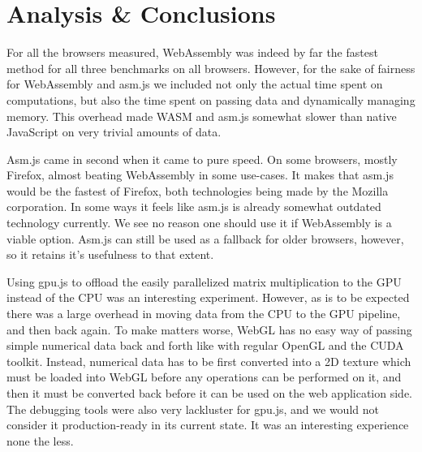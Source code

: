 \documentclass[conference]{IEEEtran}
\begin{document}
\section{Analysis \& Conclusions}
For all the browsers measured, WebAssembly was indeed by far the fastest method
for all three benchmarks on all browsers. However, for the sake of fairness for
WebAssembly and asm.js we included not only the actual time spent on
computations, but also the time spent on passing data and dynamically managing
memory. This overhead made WASM and asm.js somewhat slower than native
JavaScript on very trivial amounts of data.

Asm.js came in second when it came to pure speed. On some browsers, mostly
Firefox, almost beating WebAssembly in some use-cases. It makes that asm.js
would be the fastest of Firefox, both technologies being made by the Mozilla
corporation. In some ways it feels like asm.js is already somewhat outdated
technology currently. We see no reason one should use it if WebAssembly is a
viable option. Asm.js can still be used as a fallback for older browsers,
however, so it retains it's usefulness to that extent.

Using gpu.js to offload the easily parallelized matrix multiplication to the
GPU instead of the CPU was an interesting experiment. However, as is to be
expected there was a large overhead in moving data from the CPU to the GPU
pipeline, and then back again. To make matters worse, WebGL has no easy way of
passing simple numerical data back and forth like with regular OpenGL and the
CUDA toolkit. Instead, numerical data has to be first converted into a 2D
texture which must be loaded into WebGL before any operations can be performed
on it, and then it must be converted back before it can be used on the web
application side. The debugging tools were also very lackluster for gpu.js, and
we would not consider it production-ready in its current state. It was an
interesting experience none the less.
\end{document}
